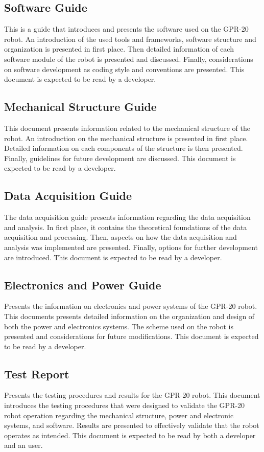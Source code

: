 \documentclass{article}
\begin{document}
\subsection{Software Guide}
This is a guide that introduces and presents the software used on the GPR-20 robot. An introduction of the used tools and frameworks, software structure and organization is presented in first place. Then detailed information of each software module of the robot is presented and discussed. Finally, considerations on software development as coding style and conventions are presented. This document is expected to be read by a developer.

\subsection{Mechanical Structure Guide}
This document presents information related to the mechanical structure of the robot. An introduction on the mechanical structure is presented in first place. Detailed information on each components of the structure is then presented. Finally, guidelines for future development are discussed. This document is expected to be read by a developer.

\subsection{Data Acquisition Guide}
The data acquisition guide presents information regarding the data acquisition and analysis. In first place, it contains the theoretical foundations of the data acquisition and processing. Then, aspects on how the data acquisition and analysis was implemented are presented. Finally, options for further development are introduced. This document is expected to be read by a developer.

\subsection{Electronics and Power Guide}
Presents the information on electronics and power systems of the GPR-20 robot. This documents presents detailed information on the organization and design of both the power and electronics systems. The scheme used on the robot is presented and considerations for future modifications. This document is expected to be read by a developer.

\subsection{Test Report}
Presents the testing procedures and results for the GPR-20 robot. This document introduces the testing procedures that were designed to validate the GPR-20 robot operation regarding the mechanical structure, power and electronic systems, and software. Results are presented to effectively validate that the robot operates as intended. This document is expected to be read by both a developer and an user.
\end{document}
